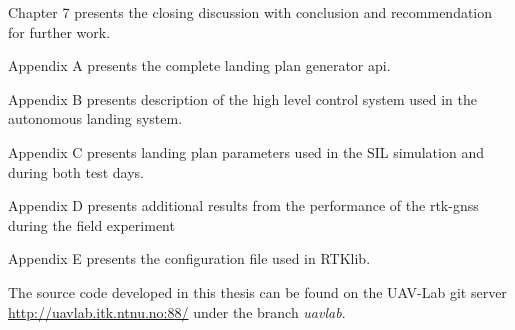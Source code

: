 Chapter 7 presents the closing discussion with conclusion and recommendation for further work.

Appendix A presents the complete landing plan generator \gls{api}.

Appendix B presents description of the high level control system used in the autonomous landing system.

Appendix C presents landing plan parameters used in the SIL simulation and during both test days.

Appendix D presents additional results from the performance of the \gls{rtk-gnss} during the field experiment

Appendix E presents the configuration file used in RTKlib.

The source code developed in this thesis can be found on the UAV-Lab git server \url{http://uavlab.itk.ntnu.no:88/} under the branch \textit{uavlab}.
\cleardoublepage